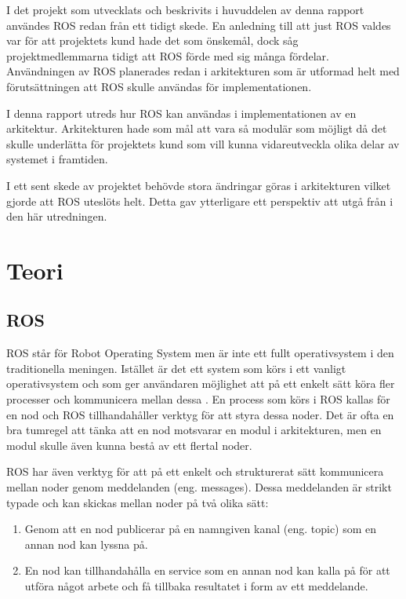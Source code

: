 I det projekt som utvecklats och beskrivits i huvuddelen av denna rapport användes ROS redan från ett tidigt skede. En anledning till att just ROS valdes var för att projektets kund hade det som önskemål, dock såg projektmedlemmarna tidigt att ROS förde med sig många fördelar. Användningen av ROS planerades redan i arkitekturen som är utformad helt med förutsättningen att ROS skulle användas för implementationen.

I denna rapport utreds hur ROS kan användas i implementationen av en arkitektur. Arkitekturen hade som mål att vara så modulär som möjligt då det skulle underlätta för projektets kund som vill kunna vidareutveckla olika delar av systemet i framtiden.

I ett sent skede av projektet behövde stora ändringar göras i arkitekturen vilket gjorde att ROS uteslöts helt. Detta gav ytterligare ett perspektiv att utgå från i den här utredningen.


\section{Teori}
\label{sec:theory-lundberg}

\subsection{ROS}
ROS står för Robot Operating System men är inte ett fullt operativsystem i den traditionella meningen. Istället är det ett system som körs i ett vanligt operativsystem och som ger användaren möjlighet att på ett enkelt sätt köra fler processer och kommunicera mellan dessa \cite{quigley2009ros}. En process som körs i ROS kallas för en nod och ROS tillhandahåller verktyg för att styra dessa noder. Det är ofta en bra tumregel att tänka att en nod motsvarar en modul i arkitekturen, men en modul skulle även kunna bestå av ett flertal noder.

ROS har även verktyg för att på ett enkelt och strukturerat sätt kommunicera mellan noder genom meddelanden (eng. messages). Dessa meddelanden är strikt typade och kan skickas mellan noder på två olika sätt:

\begin{enumerate}
	\item Genom att en nod publicerar på en namngiven kanal (eng. topic) som en annan nod kan lyssna på.
	
	\item En nod kan tillhandahålla en service som en annan nod kan kalla på för att utföra något arbete och få tillbaka resultatet i form av ett meddelande.
\end{enumerate}

